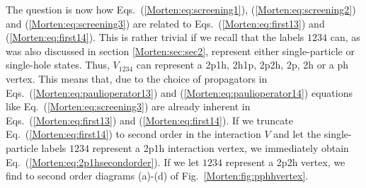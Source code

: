 The question is now  how 
Eqs.~(\ref{Morten:eq:screening1}), (\ref{Morten:eq:screening2}) and
(\ref{Morten:eq:screening3}) are related to
Eqs.~(\ref{Morten:eq:first13}) and (\ref{Morten:eq:first14}).  This is
rather trivial if we recall that the labels $1234$ can, as was also
discussed in section \ref{Morten:sec:sec2}, represent either
single-particle or single-hole states. Thus, $V_{1234}$
can represent a 2p1h, 2h1p, 2p2h, 2p, 2h or a ph vertex.  This means
that, due to the choice of propagators in
Eqs.~(\ref{Morten:eq:paulioperator13}) and
(\ref{Morten:eq:paulioperator14}) equations like
Eq.~(\ref{Morten:eq:screening3}) are already inherent in
Eqs.~(\ref{Morten:eq:first13}) and (\ref{Morten:eq:first14}). If we
truncate  Eq.~(\ref{Morten:eq:first14}) to second order in the
interaction $V$ and let the single-particle labels $1234$ represent a
2p1h interaction vertex, we immediately obtain
Eq.~(\ref{Morten:eq:2p1hsecondorder}). If we let $1234$ represent a
2p2h vertex, we find to second order diagrams (a)-(d) of Fig.\
\ref{Morten:fig:pphhvertex}.


